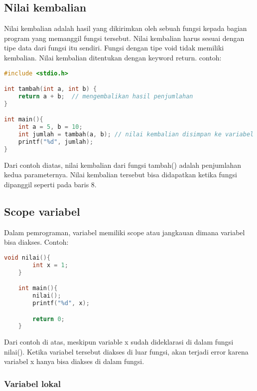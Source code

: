 \subsection{Nilai kembalian}

Nilai kembalian adalah hasil yang dikirimkan oleh sebuah fungsi kepada bagian program yang memanggil fungsi tersebut.
Nilai kembalian harus sesuai dengan tipe data dari fungsi itu sendiri.
Fungsi dengan tipe void tidak memiliki kembalian.
Nilai kembalian ditentukan dengan keyword return.
contoh:
\begin{lstlisting}[language=c]
#include <stdio.h>

int tambah(int a, int b) {
	return a + b;  // mengembalikan hasil penjumlahan
}

int main(){
	int a = 5, b = 10;
	int jumlah = tambah(a, b); // nilai kembalian disimpan ke variabel
	printf("%d", jumlah);
}
\end{lstlisting}
Dari contoh diatas, nilai kembalian dari fungsi tambah() adalah penjumlahan kedua parameternya.
Nilai kembalian tersebut bisa didapatkan ketika fungsi dipanggil seperti pada baris 8.

\subsection{Scope variabel}

Dalam pemrograman, variabel memiliki scope atau jangkauan dimana variabel bisa diakses.
Contoh:
\begin{lstlisting}[language=c]
	void nilai(){
		int x = 1;
	}

	int main(){
		nilai();
		printf("%d", x);

		return 0;
	}
\end{lstlisting}
Dari contoh di atas, meskipun variable x sudah dideklarasi di dalam fungsi nilai().
Ketika variabel tersebut diakses di luar fungsi, akan terjadi error karena variabel x hanya bisa diakses di dalam fungsi.

\subsubsection{Variabel lokal}

